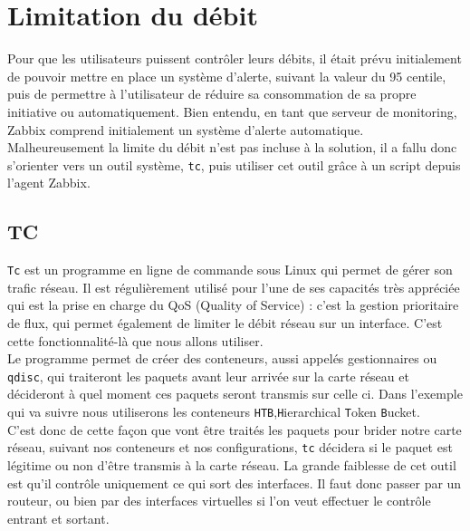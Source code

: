 \section{Limitation du débit}
	\vspace{0.3cm}
	
	Pour que les utilisateurs puissent contrôler leurs débits, il était prévu initialement de pouvoir mettre en place un système d'alerte, suivant la valeur du 95 centile, puis de permettre à l'utilisateur de réduire sa consommation de sa propre initiative ou automatiquement. Bien entendu, en tant que serveur de monitoring, Zabbix comprend initialement un système d'alerte automatique. Malheureusement la limite du débit n'est pas incluse à la solution, il a fallu donc s'orienter vers un outil système, \verb?tc?, puis utiliser cet outil grâce à un script depuis l'agent Zabbix.\\

	\subsection{TC}
	\vspace{0.4cm}
	
		\verb?Tc? est un programme en ligne de commande sous Linux qui permet de gérer son trafic réseau. Il est régulièrement utilisé pour l'une de ses capacités très appréciée qui est la prise en charge du QoS (Quality of Service) : c'est la gestion prioritaire de flux, qui permet également de limiter le débit réseau sur un interface. C'est cette fonctionnalité-là que nous allons utiliser.\\
	
		Le programme permet de créer des conteneurs, aussi appelés gestionnaires ou \verb?qdisc?, qui traiteront les paquets avant leur arrivée sur la carte réseau et décideront à quel moment ces paquets seront transmis sur celle ci. Dans l'exemple qui va suivre nous utiliserons les conteneurs \verb?HTB?,\verb?H?ierarchical \verb?T?oken \verb?B?ucket.\\
		
		C'est donc de cette façon que vont être traités les paquets pour brider notre carte réseau, suivant nos conteneurs et nos configurations, \verb?tc? décidera si le paquet est légitime ou non d'être transmis à la carte réseau. La grande faiblesse de cet outil est qu'il contrôle uniquement ce qui sort des interfaces. Il faut donc passer par un routeur, ou bien par des interfaces virtuelles si l'on veut effectuer le contrôle entrant et sortant.\\
	
